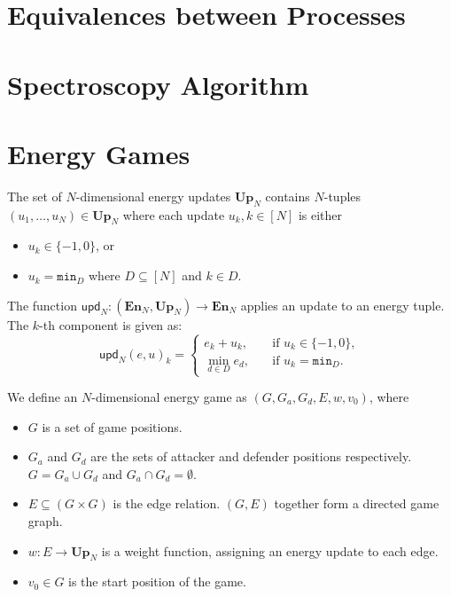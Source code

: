 
\section{Equivalences between Processes}

\section{Spectroscopy Algorithm}

\section{Energy Games} \label{sec:energy_games}

\begin{definition} \label{def:update}
    The set of $N$-dimensional energy updates $\mathbf{Up}_N$ contains
    $N$-tuples $(u_1, \ldots, u_N) \in \mathbf{Up}_N$ where each update $u_k, k
    \in [N]$ is
    either
    \begin{itemize}
        \item $u_k \in \{-1, 0\}$, or
        \item $u_k = \mathtt{min}_D$ where $D \subseteq [N]$ and $k \in D$.
    \end{itemize}

    The function
    $\mathsf{upd}_N: (\mathbf{En}_N, \mathbf{Up}_N) \rightarrow \mathbf{En}_N$
    applies an update to an energy tuple.
    The $k$-th component is given as:
    \begin{equation*}
        \mathsf{upd}_N(e, u)_k =
        \begin{cases}
            e_k + u_k,\quad &\text{if } u_k \in \{-1, 0\}, \\
            \min_{d \in D}{e_d},\quad &\text{if } u_k = \mathtt{min}_D.
        \end{cases}
    \end{equation*}
\end{definition}

\begin{definition} \label{def:energy_game}
    We define an $N$-dimensional energy game as
    $(G, G_a, G_d, E, w, v_0)$, where 
    \begin{itemize}
        \item $G$ is a set of game positions.
        \item $G_a$ and $G_d$ are the sets of attacker and defender positions
            respectively.
            $G = G_a \cup G_d$ and $G_a \cap G_d = \emptyset$.
        \item $E \subseteq (G \times G)$ is the edge relation. $(G, E)$
            together form a directed game graph.
        \item $w: E \rightarrow \mathbf{Up}_N$ is a weight function, assigning an
            energy update to each edge.
        \item $v_0 \in G$ is the start position of the game.
    \end{itemize}
\end{definition}

